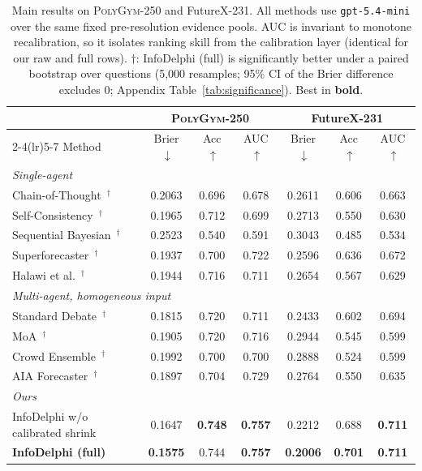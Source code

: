 \begin{table}[t]
\centering
\small
\caption{Main results on \textsc{PolyGym}-250 and FutureX-231. All methods use \texttt{gpt-5.4-mini} over the same fixed pre-resolution evidence pools. AUC is invariant to monotone recalibration, so it isolates ranking skill from the calibration layer (identical for our raw and full rows). $\dagger$: InfoDelphi (full) is significantly better under a paired bootstrap over questions (5{,}000 resamples; 95\% CI of the Brier difference excludes 0; Appendix Table~\ref{tab:significance}). Best in \textbf{bold}.}
\label{tab:main}
\begin{tabular}{lcccccc}
\toprule
 & \multicolumn{3}{c}{\textsc{PolyGym}-250} & \multicolumn{3}{c}{FutureX-231} \\
\cmidrule(lr){2-4}\cmidrule(lr){5-7}
Method & Brier$\,\downarrow$ & Acc$\,\uparrow$ & AUC$\,\uparrow$ & Brier$\,\downarrow$ & Acc$\,\uparrow$ & AUC$\,\uparrow$ \\
\midrule
\multicolumn{7}{l}{\textit{Single-agent}} \\
Chain-of-Thought~\citep{wei2022chain}$^\dagger$ & 0.2063 & 0.696 & 0.678 & 0.2611 & 0.606 & 0.663 \\
Self-Consistency~\citep{wangself}$^\dagger$ & 0.1965 & 0.712 & 0.699 & 0.2713 & 0.550 & 0.630 \\
Sequential Bayesian~\citep{shi2023language}$^\dagger$ & 0.2523 & 0.540 & 0.591 & 0.3043 & 0.485 & 0.534 \\
Superforecaster~\citep{karger2024forecastbench}$^\dagger$ & 0.1937 & 0.700 & 0.722 & 0.2596 & 0.636 & 0.672 \\
Halawi et al.~\citep{halawi2024approaching}$^\dagger$ & 0.1944 & 0.716 & 0.711 & 0.2654 & 0.567 & 0.629 \\
\midrule
\multicolumn{7}{l}{\textit{Multi-agent, homogeneous input}} \\
Standard Debate~\citep{du2023improving}$^\dagger$ & 0.1815 & 0.720 & 0.711 & 0.2433 & 0.602 & 0.694 \\
MoA~\citep{wangmixture}$^\dagger$ & 0.1905 & 0.720 & 0.716 & 0.2944 & 0.545 & 0.599 \\
Crowd Ensemble~\citep{schoenegger2024wisdom}$^\dagger$ & 0.1992 & 0.700 & 0.700 & 0.2888 & 0.524 & 0.599 \\
AIA Forecaster~\citep{alur2025aia}$^\dagger$ & 0.1897 & 0.704 & 0.729 & 0.2764 & 0.550 & 0.635 \\
\midrule
\multicolumn{7}{l}{\textit{Ours}} \\
InfoDelphi w/o calibrated shrink & 0.1647 & \textbf{0.748} & \textbf{0.757} & 0.2212 & 0.688 & \textbf{0.711} \\
\textbf{InfoDelphi (full)} & \textbf{0.1575} & 0.744 & \textbf{0.757} & \textbf{0.2006} & \textbf{0.701} & \textbf{0.711} \\
\bottomrule
\end{tabular}
\end{table}
